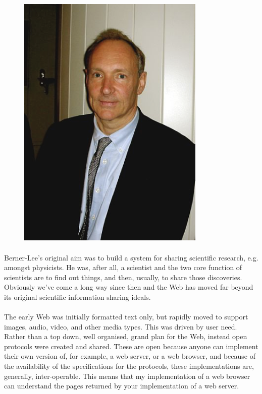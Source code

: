 \begin{figure}[H]
\centering
\includegraphics[width=0.8\textwidth]{figures/tim-berners-lee.png}
\label{fig:tim-berners-lee}
\end{figure}


\paragraph{} Berner-Lee's original aim was to build a system for sharing scientific research, e.g. amongst physicists. He was, after all, a scientist and the two core function of scientists are to find out things, and then, usually, to share those discoveries. Obviously we’ve come a long way since then and the Web has moved far beyond its original scientific information sharing ideals.
\paragraph{} The early Web was initially formatted text only, but rapidly moved to support images, audio, video, and other media types. This was driven by user need. Rather than a top down, well organised, grand plan for the Web, instead open protocols were created and shared. These are open because anyone can implement their own version of, for example, a web server, or a web browser, and because of the availability of the specifications for the protocols, these implementations are, generally, inter-operable. This means that my implementation of a web browser can understand the pages returned by your implementation of a web server.
